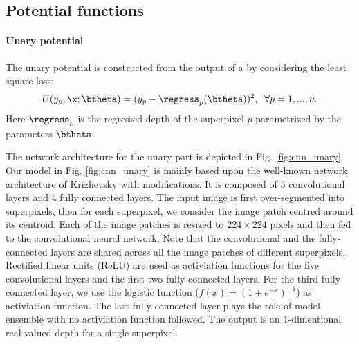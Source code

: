 \subsection{Potential functions}
\label{sec:potentials}

\paragraph{Unary potential}
The unary potential is constructed from the output of a \cnn by considering the least square loss:
\begin{equation}\label{eq:unary}
U(y_{p}, \x;\btheta) = (y_p - \regress_p (\btheta))^2, \;\; \forall p=1,...,n.
\end{equation}
Here $\regress_p$ is the regressed depth of the superpixel $p$ parametrized by the \cnn parameters $\btheta$.
%

The network architecture for the unary part is depicted in Fig. \ref{fig:cnn_unary}.
Our \cnn model in Fig. \ref{fig:cnn_unary} is mainly based upon the well-known network architecture of Krizhevsky \etal \cite{AlexNet12} with modifications. 
It is composed of $5$ convolutional layers and $4$ fully connected layers. 
The input image is first over-segmented into superpixels, then for each superpixel, we consider the image patch centred around its centroid. Each of the image patches is resized to $ 224 \times 224$ pixels and then fed to the convolutional neural network.
Note that the convolutional and the fully-connected layers are shared across all the image patches of different superpixels. 
Rectified linear units (ReLU) are used as activiation functions for the five convolutional layers and the first two fully connected layers. 
For the third fully-connected layer, we use the logistic function ($f(x)=(1+e^{-x})^{-1}$) as activiation function.
%
The last fully-connected layer plays the role of model ensemble with no activiation function followed. 
The output is an $1$-dimentional real-valued depth for a single superpixel.  










